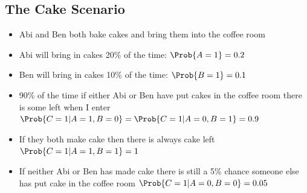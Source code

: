 
\begin{slide}
\section[-2]{The Cake Scenario}

\begin{PauseHighLight}\squeeze
  \begin{itemize}
  \item Abi and Ben both bake cakes and bring them into the
    coffee room\pause
  \item Abi will bring in cakes 20\% of the time: \(\Prob{A=1} = 0.2\)\pause
  \item Ben will bring in cakes 10\% of the time: \(\Prob{B=1} = 0.1\)\pause
  \item 90\% of the time if either Abi or Ben have put cakes in the
    coffee room there is some left when I enter
    \(\Prob{C=1|A=1,B=0} = \Prob{C=1|A=0,B=1}=0.9\)\pause
  \item If they both make cake then there is always cake left  \(\Prob{C=1|A=1,B=1}=1\)\pause
  \item If neither Abi or Ben has made cake there is still a 5\%\pause
    chance someone else has put cake in the coffee room \(\Prob{C=1|A=0,B=0}=0.05\)\pause
  \end{itemize}
\end{PauseHighLight}


\end{slide}


